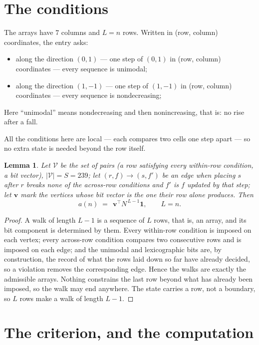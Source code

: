 \documentclass[11pt,a4paper]{article}
\theoremstyle{plain}
\newtheorem{lemma}[theorem]{Lemma}
\theoremstyle{definition}
\begin{document}
\section{The conditions}

The arrays have $7$ columns and $L=n$ rows. Written in (row, column)
coordinates, the entry asks:
\begin{itemize}
\item along the direction $(0,1)$ --- one step of $(0,1)$ in (row, column) coordinates --- every sequence is unimodal;
\item along the direction $(1,-1)$ --- one step of $(1,-1)$ in (row, column) coordinates --- every sequence is nondecreasing;
\end{itemize}
Here ``unimodal'' means nondecreasing and then nonincreasing, that is: no rise after a fall.

All the conditions here are local --- each compares two cells one step apart ---
so no extra state is needed beyond the row itself.

\begin{lemma}\label{lem:walk}
Let $\mathcal V$ be the set of pairs (a row satisfying every within-row condition, a
bit vector), $|\mathcal V|=S=239$; let $(r,f)\to(s,f')$ be an edge when placing $s$ after $r$
breaks none of the across-row conditions and $f'$ is $f$ updated by that step; let
$\mathbf{v}$ mark the vertices whose bit vector is the one their row alone produces.
Then
\[
a(n)\;=\;\,\mathbf{v}^{\!\top}N^{\,L-1}\mathbf{1},\qquad L=n.
\]
\end{lemma}

\begin{proof}
A walk of length $L-1$ is a sequence of $L$ rows, that is, an array, and its bit component
is determined by them. Every within-row condition is imposed on each vertex; every
across-row condition compares two consecutive rows and is imposed on each edge; and the
unimodal and lexicographic bits are, by construction, the record of what the rows laid down
so far have already decided, so a violation removes the corresponding edge. Hence the walks
are exactly the admissible arrays. Nothing constrains the last row beyond what has already
been imposed, so the walk may end anywhere. The state carries a row, not a boundary, so
$L$ rows make a walk of length $L-1$.
\end{proof}

\section{The criterion, and the computation}
\end{document}
